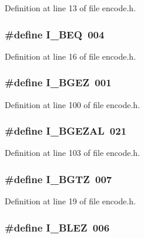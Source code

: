 Definition at line 13 of file encode.\+h.

\subsubsection[{I\+\_\+\+B\+EQ}]{\setlength{\rightskip}{0pt plus 5cm}\#define I\+\_\+\+B\+EQ~004}\label{encode_8h_a0876f345c90774882138424ca2e3d6f2}


Definition at line 16 of file encode.\+h.

\subsubsection[{I\+\_\+\+B\+G\+EZ}]{\setlength{\rightskip}{0pt plus 5cm}\#define I\+\_\+\+B\+G\+EZ~001}\label{encode_8h_adedc09f1527311187049f35fd567f347}


Definition at line 100 of file encode.\+h.

\subsubsection[{I\+\_\+\+B\+G\+E\+Z\+AL}]{\setlength{\rightskip}{0pt plus 5cm}\#define I\+\_\+\+B\+G\+E\+Z\+AL~021}\label{encode_8h_ac2776a9baa4c07982a27a14d31341675}


Definition at line 103 of file encode.\+h.

\subsubsection[{I\+\_\+\+B\+G\+TZ}]{\setlength{\rightskip}{0pt plus 5cm}\#define I\+\_\+\+B\+G\+TZ~007}\label{encode_8h_af26289e4b48fe00bd88f16d650451d0a}


Definition at line 19 of file encode.\+h.

\subsubsection[{I\+\_\+\+B\+L\+EZ}]{\setlength{\rightskip}{0pt plus 5cm}\#define I\+\_\+\+B\+L\+EZ~006}\label{encode_8h_aca573b20d63b16d4ac92447cabe7ce60}


